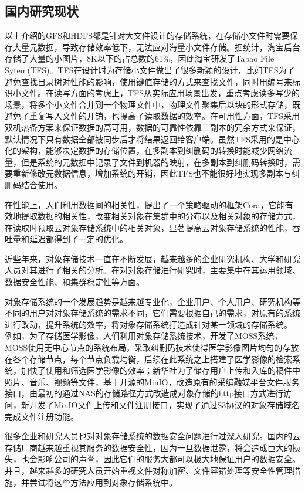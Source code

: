 \subsection{国内研究现状}%
以上介绍的GFS和HDFS都是针对大文件设计的存储系统，在存储小文件时需要保存大量元数据，导致存储效率低下，无法应对海量小文件存储。据统计，淘宝后台存储了大量的小图片，8K以下的占总数的61$\%$\cite{24}，因此淘宝研发了Tabao File Sytem\cite{25}(TFS)。TFS在设计时为存储小文件做出了很多新颖的设计，比如TFS为了避免查找目录树对性能的影响，使用键值存储的方式来查找文件，同时用编号来标识小文件。在读写方面的考虑上，TFS从实际应用场景出发，重点考虑读多写少的场景，将多个小文件合并到一个物理文件中，物理文件聚集后以块的形式存储，既避免了重复写入文件的开销，也提高了读取数据的效率。在可用性方面，TFS采用双机热备\cite{26}方案来保证数据的高可用，数据的可靠性依靠三副本的冗余方式来保证，默认情况下只有数据全部被同步后才将结果返回给客户端。虽然TFS采用的是中心化的架构，能够决定数据的存储位置，在多副本到纠删码的转换时能减少网络流量，但是系统的元数据中记录了文件到机器的映射，在多副本到纠删码转换时，需要重新修改元数据信息，增加系统的开销，因此TFS也不能很好地实现多副本与纠删码结合使用。

在性能上，人们利用数据间的相关性，提出了一个策略驱动的框架Cora\cite{27}，它能有效地提取数据的相关性，改变相关对象在集群中的分布以及相关对象的存储方式，在读取时预取云对象存储系统中的相关对象，显著提高云对象存储系统的性能，吞吐量和延迟都得到了一定的优化。

近些年来，对象存储技术一直在不断发展，越来越多的企业研究机构、大学和研究人员对其进行了相关的分析。在对对象存储进行研究时，主要集中在其运用领域、数据安全性能、和集群稳定性等方面。

对象存储系统的一个发展趋势是越来越专业化，企业用户、个人用户、研究机构等不同的用户对对象存储系统的需求不同，它们需要根据自己的需求，对原有的系统进行改动，提升系统的效率，将对象存储系统打造成针对某一领域的存储系统\cite{28,29}。 例如，为了存储医学影像，人们利用对象存储系统技术，开发了MOSS系统\cite{30}，MOSS使用无中心节点的系统布局，采取纠删码技术使得医学影像图片均匀的存放在各个存储节点，每个节点负载均衡，后续在此系统之上搭建了医学影像的检索系统，加快了使用和筛选医学影像的效率；新华社为了储存用户上传和入库的稿件中照片、音乐、视频等文件，基于开源的MinIO，改造原有的采编融媒平台文件服务接口\cite{31}，由最初的通过NAS的存储路径方式改造成对象存储的http接口方式进行访问，新开发了MinIO文件上传和文件注册接口，实现了通过S3协议的对象存储域名完成文件注册功能。

很多企业和研究人员也对对象存储系统的数据安全问题进行过深入研究。国内的云存储厂商越来越重视其服务的数据安全性，因为一旦数据泄露，将会造成巨大的损失，也会影响公司的声誉，因此它们的服务大都可以极大地保证用户的数据安全。并且，越来越多的研究人员开始重视文件对称加密\cite{32}、文件容错处理等安全性管理措施，并尝试将这些方法应用到对象存储系统中。

